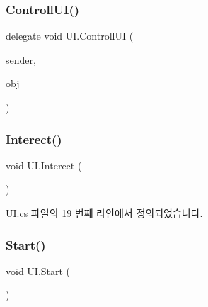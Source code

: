 \subsubsection{\texorpdfstring{ControllUI()}{ControllUI()}}
{\footnotesize\ttfamily delegate void U\+I.\+Controll\+UI (\begin{DoxyParamCaption}\item[{\mbox{\hyperlink{class_u_i}{UI}}}]{sender,  }\item[{Game\+Object \mbox{[}$\,$\mbox{]}}]{obj }\end{DoxyParamCaption})}

\mbox{\label{class_u_i_aaa07d6418e10e4c03f821c8ce95c4fa5}} 
\subsubsection{\texorpdfstring{Interect()}{Interect()}}
{\footnotesize\ttfamily void U\+I.\+Interect (\begin{DoxyParamCaption}{ }\end{DoxyParamCaption})}



U\+I.\+cs 파일의 19 번째 라인에서 정의되었습니다.


\begin{DoxyCode}{0}

\end{DoxyCode}
\mbox{\label{class_u_i_abab0d820e653a8e381038145e7622814}} 
\subsubsection{\texorpdfstring{Start()}{Start()}}
{\footnotesize\ttfamily void U\+I.\+Start (\begin{DoxyParamCaption}{ }\end{DoxyParamCaption})\hspace{0.3cm}{\ttfamily [private]}}



